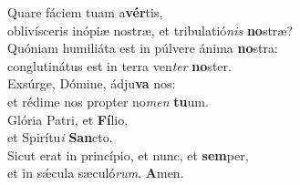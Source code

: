 \evenverse Quare fáciem tuam a\textbf{vér}tis,~\*\\
\evenverse oblivísceris inópiæ nostræ, et tribulatió\textit{nis} \textbf{no}stræ?\\
\oddverse Quóniam humiliáta est in púlvere ánima \textbf{no}stra:~\*\\
\oddverse conglutinátus est in terra ven\textit{ter} \textbf{no}ster.\\
\evenverse Exsúrge, Dómine, ádju\textbf{va} nos:~\*\\
\evenverse et rédime nos propter no\textit{men} \textbf{tu}um.\\
\oddverse Glória Patri, et \textbf{Fí}lio,~\*\\
\oddverse et Spirítu\textit{i} \textbf{San}cto.\\
\evenverse Sicut erat in princípio, et nunc, et \textbf{sem}per,~\*\\
\evenverse et in sǽcula sæculó\textit{rum}. \textbf{A}men.\\
